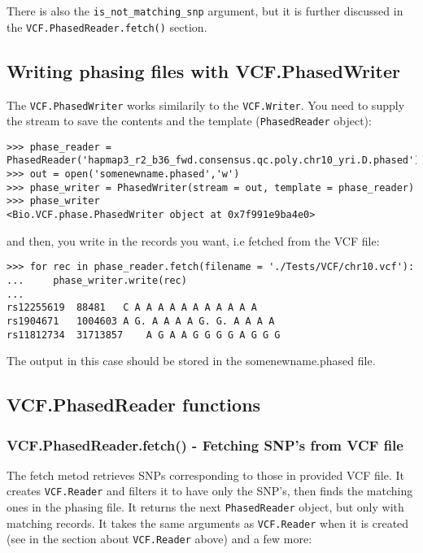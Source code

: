 \noindent There is also the \verb|is_not_matching_snp| argument, but it is further discussed in the \verb|VCF.PhasedReader.fetch()|
section.

\subsection{Writing phasing files with VCF.PhasedWriter}

\noindent The \verb|VCF.PhasedWriter| works similarily to the \verb|VCF.Writer|. You need to supply the stream to save the contents and
the template (\verb|PhasedReader| object):

\begin{verbatim}
>>> phase_reader = PhasedReader('hapmap3_r2_b36_fwd.consensus.qc.poly.chr10_yri.D.phased')
>>> out = open('somenewname.phased','w')
>>> phase_writer = PhasedWriter(stream = out, template = phase_reader)
>>> phase_writer
<Bio.VCF.phase.PhasedWriter object at 0x7f991e9ba4e0>
\end{verbatim}

\noindent and then, you write in the records you want, i.e fetched from the VCF file:

\begin{verbatim}
>>> for rec in phase_reader.fetch(filename = './Tests/VCF/chr10.vcf'):
...     phase_writer.write(rec)
...
rs12255619	88481	C A A A A A A A A A A A
rs1904671	1004603	A G. A A A A G. G. A A A A
rs11812734	31713857	A G A A G G G G A G G G

\end{verbatim}

\noindent The output in this case should be stored in the somenewname.phased file.

\subsection{VCF.PhasedReader functions}

\subsubsection{VCF.PhasedReader.fetch() - Fetching SNP's from VCF file}

\noindent The fetch metod retrieves SNPs corresponding to those in provided VCF file. It creates \verb|VCF.Reader|
and filters it to have only the SNP's, then finds the matching ones in the phasing file. It returns the next \verb|PhasedReader| object, but only with matching records.
It takes the same arguments as \verb|VCF.Reader| when it is created (see in the section about \verb|VCF.Reader| above) and a few more:

